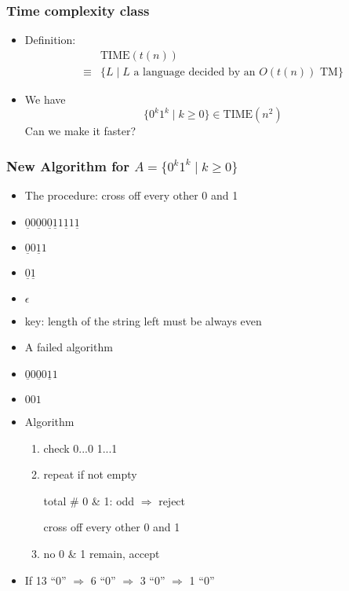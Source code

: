 \begin{frame}[allowframebreaks] \frametitle{Time complexity class}
  \begin{itemize}
  \item Definition:
    \begin{equation*}
      \begin{split}
& \text{TIME}(t(n))\\
\equiv
& \{ L\mid L \text{ a language decided by an $O(t(n))$ TM}
\}
\end{split}
\end{equation*}
\item We have
  \begin{equation*}
  \{0^k 1^k \mid k \geq 0\} \in \text{TIME}(n^2)
\end{equation*}
Can we make it faster?

\end{itemize}\end{frame} \begin{frame}[allowframebreaks] \frametitle{New Algorithm for $A=\{0^k 1^k\mid k \geq 0\}$}
  \begin{itemize}
\item The procedure: cross off every other 0 and 1
\item []$\underline{0}0
\underline{0}0
\underline{0}
\underline{1}1
\underline{1}1
\underline{1}
$
\item []
$\underline{0}0
\underline{1}1
$
\item []
$\underline{0}
\underline{1}
$
\item []
$\epsilon$

\item [] key: length of the string left must be always even

\item A failed algorithm

\item []
$\underline{0}0
\underline{0}0
\underline{1}1
$
\item []
$001
$

\item 
Algorithm
\begin{enumerate}
\item check 0...0 1...1
\item repeat if not empty 

total \# 0 \& 1: odd $\Rightarrow$ reject

cross off every other 0 and 1
\item no 0 \& 1 remain, accept
\end{enumerate}
\item If  13 ``0'' $\Rightarrow$
6 ``0'' $\Rightarrow$
3 ``0'' $\Rightarrow$
1 ``0'' 


\end{itemize}
\end{frame}
